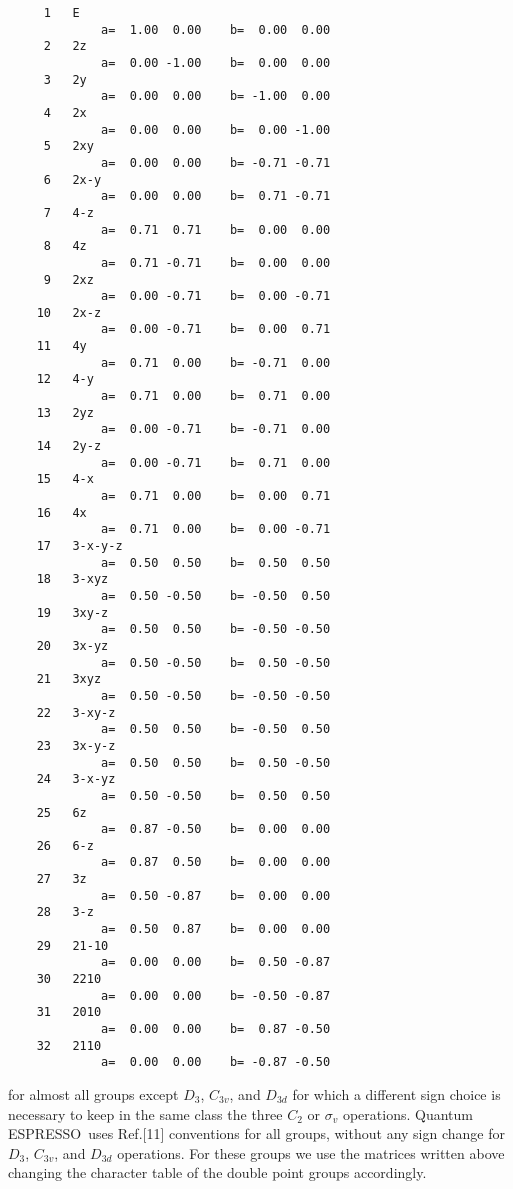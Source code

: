 \documentclass[12pt,a4paper]{article}
\def\qe{{\sc Quantum ESPRESSO}}
\begin{document}
\begin{verbatim}
     1   E       
             a=  1.00  0.00    b=  0.00  0.00   
     2   2z      
             a=  0.00 -1.00    b=  0.00  0.00    
     3   2y      
             a=  0.00  0.00    b= -1.00  0.00    
     4   2x      
             a=  0.00  0.00    b=  0.00 -1.00   
     5   2xy     
             a=  0.00  0.00    b= -0.71 -0.71    
     6   2x-y    
             a=  0.00  0.00    b=  0.71 -0.71     
     7   4-z     
             a=  0.71  0.71    b=  0.00  0.00  
     8   4z      
             a=  0.71 -0.71    b=  0.00  0.00   
     9   2xz     
             a=  0.00 -0.71    b=  0.00 -0.71  
    10   2x-z    
             a=  0.00 -0.71    b=  0.00  0.71     
    11   4y      
             a=  0.71  0.00    b= -0.71  0.00   
    12   4-y     
             a=  0.71  0.00    b=  0.71  0.00   
    13   2yz     
             a=  0.00 -0.71    b= -0.71  0.00  
    14   2y-z    
             a=  0.00 -0.71    b=  0.71  0.00  
    15   4-x     
             a=  0.71  0.00    b=  0.00  0.71  
    16   4x      
             a=  0.71  0.00    b=  0.00 -0.71   
    17   3-x-y-z 
             a=  0.50  0.50    b=  0.50  0.50    
    18   3-xyz   
             a=  0.50 -0.50    b= -0.50  0.50   
    19   3xy-z   
             a=  0.50  0.50    b= -0.50 -0.50   
    20   3x-yz   
             a=  0.50 -0.50    b=  0.50 -0.50  
    21   3xyz    
             a=  0.50 -0.50    b= -0.50 -0.50  
    22   3-xy-z  
             a=  0.50  0.50    b= -0.50  0.50    
    23   3x-y-z  
             a=  0.50  0.50    b=  0.50 -0.50    
    24   3-x-yz  
             a=  0.50 -0.50    b=  0.50  0.50    
    25   6z      
             a=  0.87 -0.50    b=  0.00  0.00    
    26   6-z     
             a=  0.87  0.50    b=  0.00  0.00    
    27   3z      
             a=  0.50 -0.87    b=  0.00  0.00    
    28   3-z     
             a=  0.50  0.87    b=  0.00  0.00    
    29   21-10   
             a=  0.00  0.00    b=  0.50 -0.87      
    30   2210    
             a=  0.00  0.00    b= -0.50 -0.87    
    31   2010    
             a=  0.00  0.00    b=  0.87 -0.50     
    32   2110    
             a=  0.00  0.00    b= -0.87 -0.50    
\end{verbatim}
for almost all groups except $D_3$, $C_{3v}$, and $D_{3d}$ for which
a different sign choice is necessary to keep in the same class the three
$C_2$ or $\sigma_v$ operations. \qe\ uses 
Ref.[11] conventions for all groups, without any sign change for
$D_3$, $C_{3v}$, and $D_{3d}$ operations. For these groups we use the
matrices written above changing the character table of the double point 
groups accordingly. 
\end{document}
